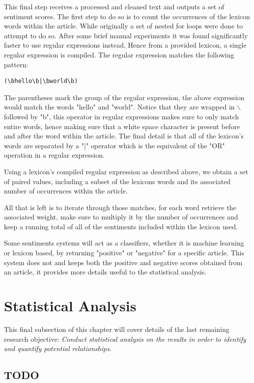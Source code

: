 This final step receives a processed and cleaned text and outputs a set of sentiment scores. The first step to do so is to count the occurrences of the lexicon words within the article. While originally a set of nested for loops were done to attempt to do so. After some brief manual experiments it was found significantly faster to use regular expressions instead. Hence from a provided lexicon, a single regular expression is compiled. The regular expression matches the following pattern:
\begin{center}
\begin{verbatim}(\bhello\b|\bworld\b)\end{verbatim}
\end{center}

The parentheses mark the group of the regular expression, the above expression would match the words "hello" and "world". Notice that they are wrapped in $\backslash$ followed by "b", this operator in regular expressions makes sure to only match entire words, hence making sure that a white space character is present before and after the word within the article. The final detail is that all of the lexicon's words are separated by a "|" operator which is the equivalent of the "OR" operation in a regular expression.

Using a lexicon's compiled regular expression as described above, we obtain a set of paired values, including a subset of the lexicons words and its associated number of occurrences within the article.

All that is left is to iterate through those matches, for each word retrieve the associated weight, make sure to multiply it by the number of occurrences and keep a running total of all of the sentiments included within the lexicon used.

Some sentiments systems will act as a classifiers, whether it is machine learning or lexicon based, by returning "positive" or "negative" for a specific article. This system does not and keeps both the positive and negative scores obtained from an article, it provides more details useful to the statistical analysis.

\section{Statistical Analysis}

This final subsection of this chapter will cover details of the last remaining research objective: \emph{Conduct statistical analysis on the results in order to identify and quantify potential relationships}.

\subsection{TODO}